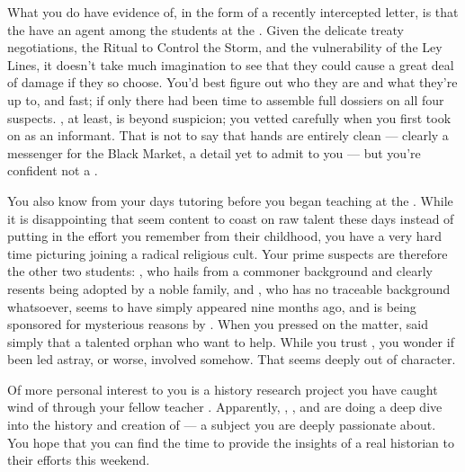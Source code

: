 \documentclass[char]{GL2020}
\begin{document}
What you do have evidence of, in the form of a recently intercepted letter, is that the \pGoaties{} have an agent among the \pFarm{} students at the \pSchool{}. Given the delicate treaty negotiations, the Ritual to Control the Storm, and the vulnerability of the Ley Lines, it doesn't take much imagination to see that they could cause a great deal of damage if they so choose. You'd best figure out who they are and what they're up to, and fast; if only there had been time to assemble full dossiers on all four suspects. \cLibAssist{}, at least, is beyond suspicion; you vetted \cLibAssist{\them} carefully when you first took \cLibAssist{\them} on as an informant. That is not to say that \cLibAssist{\their} hands are entirely clean — \cLibAssist{\they} \cLibAssist{\are} clearly a messenger for the Black Market, a detail \cLibAssist{\they} \cLibAssist{\have} yet to admit to you — but you're confident \cLibAssist{\they} \cLibAssist{\are} not a \pGoatie{}. 

You also know \cChupStudent{\full} from your days tutoring \cChupStudent{\them} before you began teaching at the \pSchool{}. While it is disappointing that \cChupStudent{\they} seem\cChupStudent{\verbs} content to coast on \cChupStudent{\their} raw talent these days instead of putting in the effort you remember from their childhood, you have a very hard time picturing \cChupStudent{\them} joining a radical religious cult. Your prime suspects are therefore the other two \pFarm{} students: \cAdopted{\full}, who hails from a commoner background and clearly resents being adopted by a noble family, and \cDisney{\full}, who has no traceable background whatsoever, seems to have simply appeared nine months ago, and is being sponsored for mysterious reasons by \cWildCard{}. When you pressed \cWildCard{} on the matter, \cWildCard{\they} said simply that \cDisney{\they \were} a talented orphan who \cWildCard{\they} want to help. While you trust \cWildCard{}, you wonder if \cWildCard{\they \have} been led astray, or worse, involved somehow. That seems deeply out of character.  

Of more personal interest to you is a history research project you have caught wind of through your fellow teacher \cBeetle{\full}. Apparently, \cEbbPriest{\full}, \cHeadScientist{\full}, and \cScholarship{\full} are doing a deep dive into the history and creation of \pEarth{}— a subject you are deeply passionate about. You hope that you can find the time to provide the insights of a real historian to their efforts this weekend.
\end{document}

